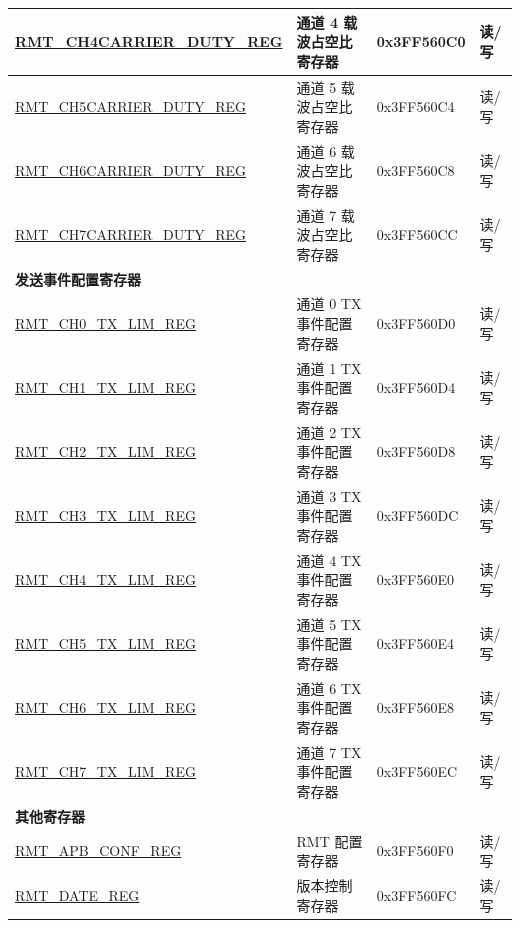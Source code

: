 \begin{longtable}{|p{5cm}|p{6.8cm} | p{2cm} | p{1.2cm} | }
\hyperref[regdesc:RMTCHnCARRIERDUTYREG]{RMT\_CH4CARRIER\_DUTY\_REG} & 通道 4 载波占空比寄存器 & 0x3FF560C0 & 读/写 \\ \hline
\hyperref[regdesc:RMTCHnCARRIERDUTYREG]{RMT\_CH5CARRIER\_DUTY\_REG} & 通道 5 载波占空比寄存器 & 0x3FF560C4 & 读/写 \\ \hline
\hyperref[regdesc:RMTCHnCARRIERDUTYREG]{RMT\_CH6CARRIER\_DUTY\_REG} & 通道 6 载波占空比寄存器 & 0x3FF560C8 & 读/写 \\ \hline
\hyperref[regdesc:RMTCHnCARRIERDUTYREG]{RMT\_CH7CARRIER\_DUTY\_REG} & 通道 7 载波占空比寄存器 & 0x3FF560CC & 读/写 \\ \hline
\multicolumn{4}{|l|}{\textbf{发送事件配置寄存器}} \\ \hline
\hyperref[regdesc:RMTCHnTXLIMREG]{RMT\_CH0\_TX\_LIM\_REG} & 通道 0 TX 事件配置寄存器 & 0x3FF560D0 & 读/写 \\ \hline
\hyperref[regdesc:RMTCHnTXLIMREG]{RMT\_CH1\_TX\_LIM\_REG} & 通道 1 TX 事件配置寄存器 & 0x3FF560D4 & 读/写 \\ \hline
\hyperref[regdesc:RMTCHnTXLIMREG]{RMT\_CH2\_TX\_LIM\_REG} & 通道 2 TX 事件配置寄存器 & 0x3FF560D8 & 读/写 \\ \hline
\hyperref[regdesc:RMTCHnTXLIMREG]{RMT\_CH3\_TX\_LIM\_REG} & 通道 3 TX 事件配置寄存器 & 0x3FF560DC & 读/写 \\ \hline
\hyperref[regdesc:RMTCHnTXLIMREG]{RMT\_CH4\_TX\_LIM\_REG} & 通道 4 TX 事件配置寄存器 & 0x3FF560E0 & 读/写 \\ \hline
\hyperref[regdesc:RMTCHnTXLIMREG]{RMT\_CH5\_TX\_LIM\_REG} & 通道 5 TX 事件配置寄存器 & 0x3FF560E4 & 读/写 \\ \hline
\hyperref[regdesc:RMTCHnTXLIMREG]{RMT\_CH6\_TX\_LIM\_REG} & 通道 6 TX 事件配置寄存器 & 0x3FF560E8 & 读/写 \\ \hline
\hyperref[regdesc:RMTCHnTXLIMREG]{RMT\_CH7\_TX\_LIM\_REG} & 通道 7 TX 事件配置寄存器 & 0x3FF560EC & 读/写 \\ \hline
\multicolumn{4}{|l|}{\textbf{其他寄存器}} \\ \hline
\hyperref[regdesc:RMTAPBCONFREG]{RMT\_APB\_CONF\_REG} & RMT 配置寄存器 & 0x3FF560F0 & 读/写 \\ \hline
\hyperref[regdesc:RMTDATEREG]{RMT\_DATE\_REG} & 版本控制寄存器 & 0x3FF560FC & 读/写 \\ \hline
\end{longtable}
